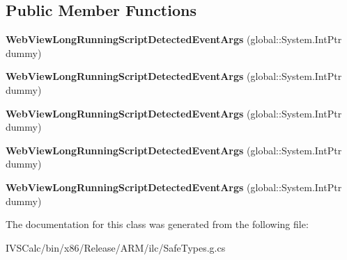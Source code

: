 \subsection*{Public Member Functions}
\begin{DoxyCompactItemize}
\item 
\mbox{\label{class_windows_1_1_u_i_1_1_xaml_1_1_controls_1_1_web_view_long_running_script_detected_event_args_a34a222e2467d155b91c52929637dd639}} 
{\bfseries Web\+View\+Long\+Running\+Script\+Detected\+Event\+Args} (global\+::\+System.\+Int\+Ptr dummy)
\item 
\mbox{\label{class_windows_1_1_u_i_1_1_xaml_1_1_controls_1_1_web_view_long_running_script_detected_event_args_a34a222e2467d155b91c52929637dd639}} 
{\bfseries Web\+View\+Long\+Running\+Script\+Detected\+Event\+Args} (global\+::\+System.\+Int\+Ptr dummy)
\item 
\mbox{\label{class_windows_1_1_u_i_1_1_xaml_1_1_controls_1_1_web_view_long_running_script_detected_event_args_a34a222e2467d155b91c52929637dd639}} 
{\bfseries Web\+View\+Long\+Running\+Script\+Detected\+Event\+Args} (global\+::\+System.\+Int\+Ptr dummy)
\item 
\mbox{\label{class_windows_1_1_u_i_1_1_xaml_1_1_controls_1_1_web_view_long_running_script_detected_event_args_a34a222e2467d155b91c52929637dd639}} 
{\bfseries Web\+View\+Long\+Running\+Script\+Detected\+Event\+Args} (global\+::\+System.\+Int\+Ptr dummy)
\item 
\mbox{\label{class_windows_1_1_u_i_1_1_xaml_1_1_controls_1_1_web_view_long_running_script_detected_event_args_a34a222e2467d155b91c52929637dd639}} 
{\bfseries Web\+View\+Long\+Running\+Script\+Detected\+Event\+Args} (global\+::\+System.\+Int\+Ptr dummy)
\end{DoxyCompactItemize}


The documentation for this class was generated from the following file\+:\begin{DoxyCompactItemize}
\item 
I\+V\+S\+Calc/bin/x86/\+Release/\+A\+R\+M/ilc/Safe\+Types.\+g.\+cs\end{DoxyCompactItemize}
